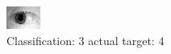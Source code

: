 \begin{figure}[h!]
\begin{center}
\includegraphics[width=0.60\columnwidth]{figures/ID1222_class_3_target_4.png}
\end{center}
\caption{ Classification: 3 actual target: 4}
\label{fig:ID1222_class_3_target_4}
\end{figure}
